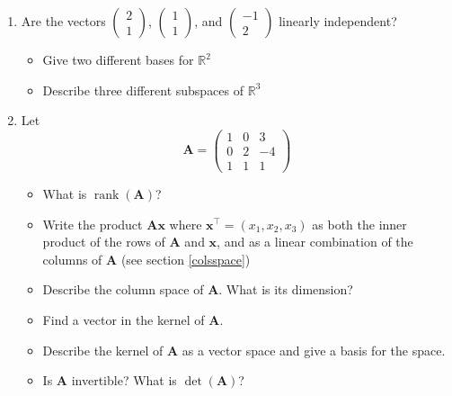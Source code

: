 \documentclass[
]{book}
\providecommand{\tightlist}{%
  \setlength{\itemsep}{0pt}\setlength{\parskip}{0pt}}
\theoremstyle{definition}
\theoremstyle{definition}
\theoremstyle{definition}
\theoremstyle{definition}
\theoremstyle{remark}
\begin{document}
\begin{enumerate}
\def\labelenumi{\arabic{enumi}.}
\item
  Are the vectors \(\left( \begin{array}{c}2\\1\end{array}\right)\), \(\left( \begin{array}{c}1\\1\end{array}\right)\), and \(\left( \begin{array}{c}-1\\2\end{array}\right)\) linearly independent?

  \begin{itemize}
  \tightlist
  \item
    Give two different bases for \(\mathbb{R}^2\)
  \item
    Describe three different subspaces of \(\mathbb{R}^3\)
  \end{itemize}
\item
  Let \[\mathbf A= \left(\begin{array}{ccc}1&0&3\\
  0&2&-4\\
  1&1&1
  \end{array}\right)\]

  \begin{itemize}
  \tightlist
  \item
    What is \(\operatorname{rank}(\mathbf A)\)?
  \item
    Write the product \(\mathbf A\mathbf x\) where \(\mathbf x^\top=(x_1, x_2, x_3)\) as both the inner product of the rows of \(\mathbf A\) and \(\mathbf x\), and as a linear combination of the columns of \(\mathbf A\) (see section \ref{colsspace})
  \item
    Describe the column space of \(\mathbf A\). What is its dimension?
  \item
    Find a vector in the kernel of \(\mathbf A\).
  \item
    Describe the kernel of \(\mathbf A\) as a vector space and give a basis for the space.
  \item
    Is \(\mathbf A\) invertible? What is \(\det(\mathbf A)\)?
  \end{itemize}
\end{enumerate}
\end{document}
